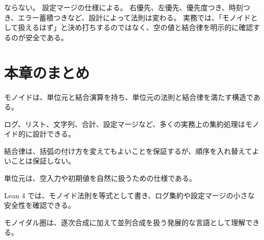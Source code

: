 ならない。
設定マージの仕様による。
右優先、左優先、優先度つき、時刻つき、エラー蓄積つきなど、設計によって法則は変わる。
実務では、「モノイドとして扱えるはず」と決め打ちするのではなく、空の値と結合律を明示的に確認するのが安全である。

\section{本章のまとめ}

モノイドは、単位元と結合演算を持ち、単位元の法則と結合律を満たす構造である。

ログ、リスト、文字列、合計、設定マージなど、多くの実務上の集約処理はモノイド的に設計できる。

結合律は、括弧の付け方を変えてもよいことを保証するが、順序を入れ替えてよいことは保証しない。

単位元は、空入力や初期値を自然に扱うための仕様である。

Lean 4 では、モノイド法則を等式として書き、ログ集約や設定マージの小さな安全性を確認できる。

モノイダル圏は、逐次合成に加えて並列合成を扱う発展的な言語として理解できる。
